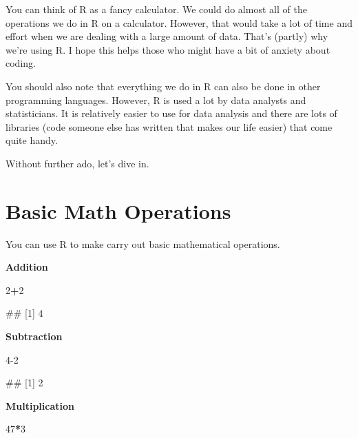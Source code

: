 \documentclass[
]{book}
\newenvironment{Shaded}{\begin{snugshade}}{\end{snugshade}}
\newcommand{\DecValTok}[1]{\textcolor[rgb]{0.00,0.00,0.81}{#1}}
\newcommand{\NormalTok}[1]{#1}
\newcommand{\SpecialCharTok}[1]{\textcolor[rgb]{0.81,0.36,0.00}{\textbf{#1}}}
\begin{document}
You can think of R as a fancy calculator. We could do almost all of the operations we do in R on a calculator. However, that would take a lot of time and effort when we are dealing with a large amount of data. That's (partly) why we're using R. I hope this helps those who might have a bit of anxiety about coding.

You should also note that everything we do in R can also be done in other programming languages. However, R is used a lot by data analysts and statisticians. It is relatively easier to use for data analysis and there are lots of libraries (code someone else has written that makes our life easier) that come quite handy.

Without further ado, let's dive in.

\hypertarget{basic-math-operations}{%
\section{Basic Math Operations}\label{basic-math-operations}}

You can use R to make carry out basic mathematical operations.

\textbf{Addition}

\begin{Shaded}
\begin{Highlighting}[]
\DecValTok{2}\SpecialCharTok{+}\DecValTok{2}
\end{Highlighting}
\end{Shaded}

\begin{Shaded}
\begin{Highlighting}[]
\NormalTok{\#\# [1] 4}
\end{Highlighting}
\end{Shaded}

\textbf{Subtraction}

\begin{Shaded}
\begin{Highlighting}[]
\DecValTok{4{-}2}
\end{Highlighting}
\end{Shaded}

\begin{Shaded}
\begin{Highlighting}[]
\NormalTok{\#\# [1] 2}
\end{Highlighting}
\end{Shaded}

\textbf{Multiplication}

\begin{Shaded}
\begin{Highlighting}[]
\DecValTok{47}\SpecialCharTok{*}\DecValTok{3}
\end{Highlighting}
\end{Shaded}
\end{document}
